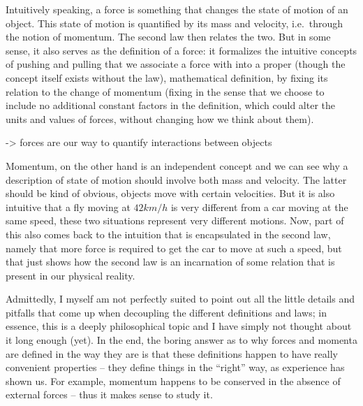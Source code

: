 \documentclass[../class_mech_main.tex]{subfiles}
\begin{document}
Intuitively speaking, a force is something that changes the state of motion of an object. This state of motion is quantified by its mass and velocity, i.e.~through the notion of momentum. The second law then relates the two. But in some sense, it also serves as the definition of a force: it formalizes the intuitive concepts of pushing and pulling that we associate a force with into a proper (though the concept itself exists without the law), mathematical definition, by fixing its relation to the change of momentum (fixing in the sense that we choose to include no additional constant factors in the definition, which could alter the units and values of forces, without changing how we think about them).

-> forces are our way to quantify interactions between objects

Momentum, on the other hand is an independent concept and we can see why a description of state of motion should involve both mass and velocity. The latter should be kind of obvious, objects move with certain velocities. But it is also intuitive that a fly moving at $42 km/h$ is very different from a car moving at the same speed, these two situations represent very different motions.
Now, part of this also comes back to the intuition that is encapsulated in the second law, namely that more force is required to get the car to move at such a speed, but that just shows how the second law is an incarnation of some relation that is present in our physical reality. 


Admittedly, I myself am not perfectly suited to point out all the little details and pitfalls that come up when decoupling the different definitions and laws; in essence, this is a deeply philosophical topic and I have simply not thought about it long enough (yet). In the end, the boring answer as to why forces and momenta are defined in the way they are is that these definitions happen to have really convenient properties -- they define things in the \enquote{right} way, as experience has shown us. For example, momentum happens to be conserved in the absence of external forces -- thus it makes sense to study it.
\end{document}
